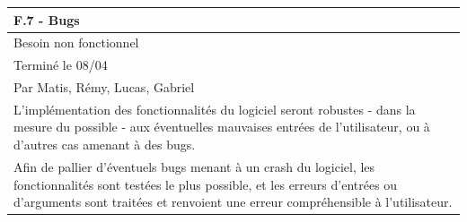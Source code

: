 \documentclass[a4paper,12pt]{article}
\begin{document}
\vspace{1cm}
\noindent
\setlength{\arrayrulewidth}{1.5pt}
\renewcommand{\arraystretch}{1.5}
\begin{tabularx}{\textwidth}{|X|}
    \hline
    \textbf{F.7 - Bugs}                                                                                                                                                                                                              \\
    \hline
    Besoin non fonctionnel                                                                                                                                                                                                           \\
    \hline
    Terminé le 08/04                                                                                                                                                                                                                 \\
    Par Matis, Rémy, Lucas, Gabriel                                                                                                                                                                                                  \\
    \hline
    L’implémentation des fonctionnalités du logiciel seront robustes - dans la mesure du possible - aux éventuelles mauvaises entrées de l’utilisateur, ou à d’autres cas amenant à des bugs.                                        \\
    \arrayrulecolor{MediumAquamarine}\hline
    \arrayrulecolor{RoyalBlue}
    Afin de pallier d'éventuels bugs menant à un crash du logiciel, les fonctionnalités sont testées le plus possible, et les erreurs d’entrées ou d’arguments sont traitées et renvoient une erreur compréhensible à l’utilisateur. \\
    \hline
\end{tabularx}

\vspace{1cm}
\end{document}
